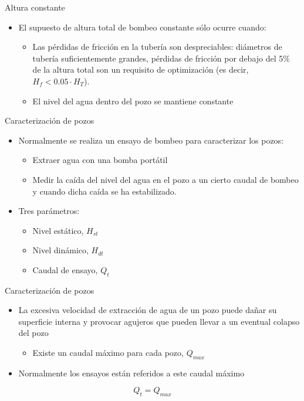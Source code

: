 \documentclass[xcolor={usenames,svgnames,dvipsnames}]{beamer}
\begin{document}
\begin{frame}[label=sec-2-2]{Altura constante}
\begin{itemize}
\item El supuesto de \alert{altura total de bombeo constante} sólo ocurre cuando:

\begin{itemize}
\item Las \alert{pérdidas de fricción en la tubería son despreciables}: diámetros de tubería suficientemente grandes, pérdidas de fricción por debajo del 5\% de la altura total son un requisito de optimización (es decir, $H_{f}<0.05\cdot H_{T}$).

\item El \alert{nivel del agua dentro del pozo se mantiene constante}
\end{itemize}
\end{itemize}
\end{frame}

\begin{frame}[label=sec-2-3]{Caracterización de pozos}
\begin{itemize}
\item Normalmente se realiza un \alert{ensayo de bombeo para caracterizar los pozos}:
\begin{itemize}
\item Extraer agua con una bomba portátil
\item Medir la caída del nivel del agua en el pozo a un cierto caudal de bombeo y cuando dicha caída se ha estabilizado.
\end{itemize}

\item Tres parámetros:

\begin{itemize}
\item \alert{Nivel estático}, $H_{st}$

\item \alert{Nivel dinámico}, $H_{dt}$

\item \alert{Caudal de ensayo}, $Q_{t}$
\end{itemize}
\end{itemize}
\end{frame}

\begin{frame}[label=sec-2-4]{Caracterización de pozos}
\begin{itemize}
\item La excesiva velocidad de extracción de agua de un pozo puede dañar su superficie interna y provocar agujeros que pueden llevar a un eventual colapso del pozo
\begin{itemize}
\item Existe un \alert{caudal máximo para cada pozo}, $Q_{max}$
\end{itemize}

\item \alert{Normalmente los ensayos están referidos a este caudal máximo}
\end{itemize}
\[
Q_{t}=Q_{max}
\]
\end{frame}
\end{document}
